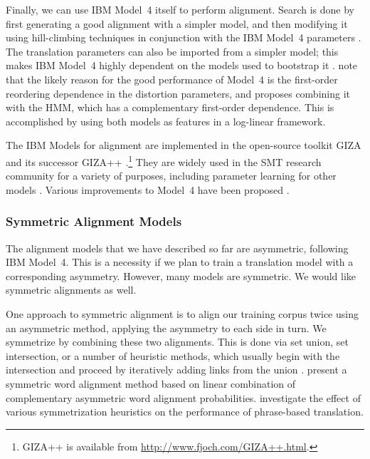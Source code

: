 Finally, we can use IBM Model~4 itself to 
perform alignment.  Search is done by first
generating a good alignment with a simpler model,
and then modifying it using hill-climbing techniques 
in conjunction with the IBM Model~4 parameters
\citep{Brown:1993:cl,Och:2003:cl}.  The translation parameters
can also be imported from a simpler model; this makes
IBM Model~4 highly dependent on the models used to bootstrap 
it \citep{Och:2003:cl,Lopez:2005:wpt}.
\citet{Och:2003:cl} note that the likely reason
for the good performance of Model~4 is the
first-order reordering dependence in the distortion
parameters, and proposes combining it with the
HMM, which has a complementary first-order 
dependence.  This is accomplished 
by using both models as features
in a log-linear framework.

The IBM Models for alignment are implemented in the
open-source toolkit GIZA and its successor GIZA++
\citep{Al-Onaizan:1999:tr,Och:2003:cl}.\footnote{
GIZA++ is available from \url{http://www.fjoch.com/GIZA++.html}.}
They are widely used in the SMT research community for
a variety of purposes,
including parameter learning for other models
\citep{Och:1999:emnlp,Yarowsky:2001:naacl,Koehn:2003:naacl,Smith:2004:emnlp}.
Various improvements to Model~4 have been proposed
\citep{Dejean:2003:wpt,Fraser:2006:acl-coling,Fraser:2007:emnlp-conll}.


\subsubsection{Symmetric Alignment Models}\label{sec:symmetric-models}

The alignment models that we have described so
far are asymmetric, following IBM Model~4.
This is a necessity if we plan to train 
a translation model with a corresponding asymmetry.  
However, many models are symmetric.  We would like
symmetric alignments as well.

One approach to symmetric alignment is 
to align our training corpus twice using an 
asymmetric method, applying the asymmetry to 
each side in turn.  We 
symmetrize by combining these two alignments.
This is done via 
set union, set intersection, or a number of 
heuristic methods, which usually begin with 
the intersection and proceed by 
iteratively adding links from the union
\citep{Och:1999:emnlp,Koehn:2003:naacl}.
\citet{Matusov:2004:coling} present
a symmetric word alignment method based on linear 
combination of complementary 
asymmetric word alignment probabilities. \citet{Ayan:2006:acl-coling}
investigate the effect of various symmetrization heuristics
on the performance of phrase-based translation.

